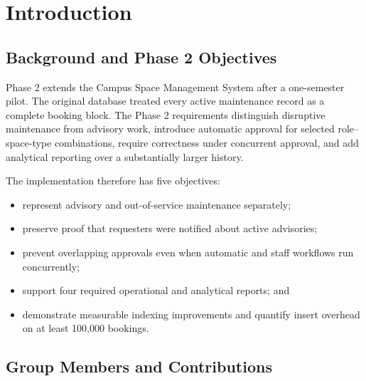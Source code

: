 \section{Introduction}

\subsection{Background and Phase 2 Objectives}

Phase 2 extends the Campus Space Management System after a one-semester pilot. The original database treated every active maintenance record as a complete booking block. The Phase 2 requirements distinguish disruptive maintenance from advisory work, introduce automatic approval for selected role--space-type combinations, require correctness under concurrent approval, and add analytical reporting over a substantially larger history.

The implementation therefore has five objectives:

\begin{itemize}
  \item represent advisory and out-of-service maintenance separately;
  \item preserve proof that requesters were notified about active advisories;
  \item prevent overlapping approvals even when automatic and staff workflows run concurrently;
  \item support four required operational and analytical reports; and
  \item demonstrate measurable indexing improvements and quantify insert overhead on at least 100,000 bookings.
\end{itemize}

\subsection{Group Members and Contributions}

